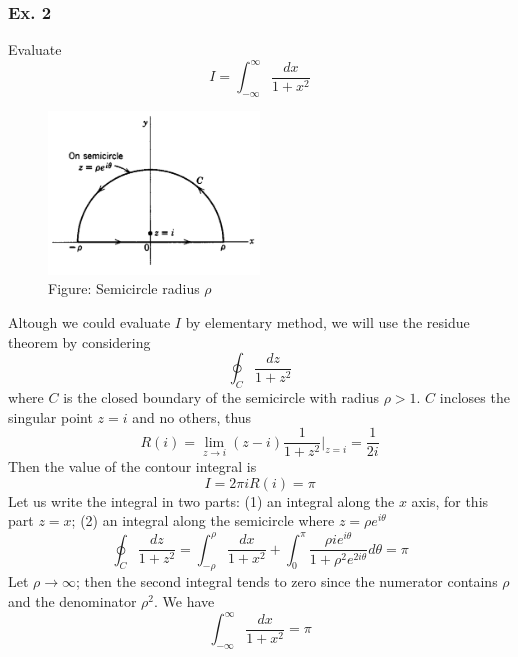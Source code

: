 \documentclass[../main.tex]{subfiles}
\begin{document}
\subsubsection*{Ex. 2} Evaluate \begin{equation*}
    I=\int_{-\infty}^{\infty}\frac{dx}{1+x^2}
\end{equation*}
\begin{figure}[b]
    \centering
    \includegraphics[width=0.5\textwidth]{../Rss/Com/Residue.png}
    \caption*{Figure: Semicircle radius $\rho$}
\end{figure}
Altough we could evaluate $I$ by elementary method, we will use the residue theorem by considering 
\begin{equation*}
    \oint_C\frac{dz}{1+z^2}
\end{equation*}
where $C$ is the closed boundary of the semicircle with radius $\rho>1$. $C$ incloses the singular point $z = i$ and no others, thus 
\begin{equation*}
    R(i)=\lim_{z\rightarrow i}(z-i)\frac{1}{1+z^2}\bigg|_{z=i}=\frac{1}{2i}
\end{equation*}
Then the value of the contour integral is
\begin{equation*}
    I=2\pi i R(i)=\pi
\end{equation*}
Let us write the integral in two parts: (1) an integral along the $x$ axis, for this part $z = x$; (2) 
an integral along the semicircle where $z = \rho e^{i\theta}$
\begin{equation*}
    \oint_C\frac{dz}{1+z^2}=\int_{-\rho}^{\rho}\frac{dx}{1+x^2}+\int_{0}^{\pi}\frac{\rho i e^{i\theta}}{1+ \rho^2 e^{2i\theta}}d\theta=\pi
\end{equation*}
Let $\rho\rightarrow\infty$; then the second integral tends to zero since the numerator contains $\rho$ and the denominator $\rho^2$. We have 
\begin{equation*}
    \int_{-\infty}^{\infty}\frac{dx}{1+x^2}=\pi
\end{equation*}
\end{document}
